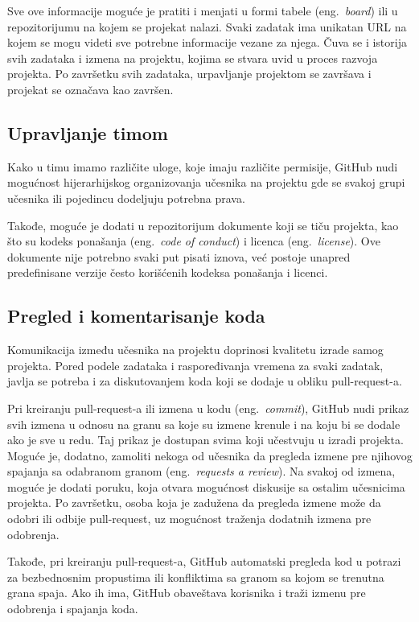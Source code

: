 \documentclass[12pt]{report}
\begin{document}
Sve ove informacije moguće je pratiti i menjati u formi tabele (eng.\ \textit{board}) ili u repozitorijumu na kojem se projekat nalazi. Svaki zadatak ima unikatan URL na kojem se mogu videti sve potrebne informacije vezane za njega. Čuva se i istorija svih zadataka i izmena na projektu, kojima se stvara uvid u proces razvoja projekta. Po završetku svih zadataka, urpavljanje projektom se završava i projekat se označava kao završen.

\subsection{Upravljanje timom}
Kako u timu imamo različite uloge, koje imaju različite permisije, GitHub nudi mogućnost hijerarhijskog organizovanja učesnika na projektu gde se svakoj grupi učesnika ili pojedincu dodeljuju potrebna prava.

Takođe, moguće je dodati u repozitorijum dokumente koji se tiču projekta, kao što su kodeks ponašanja (eng.\ \textit{code of conduct}) i licenca (eng.\ \textit{license}). Ove dokumente nije potrebno svaki put pisati iznova, već postoje unapred predefinisane verzije često korišćenih kodeksa ponašanja i licenci.

\subsection{Pregled i komentarisanje koda}
Komunikacija između učesnika na projektu doprinosi kvalitetu izrade samog projekta. Pored podele zadataka i raspoređivanja vremena za svaki zadatak, javlja se potreba i za diskutovanjem koda koji se dodaje u obliku pull-request-a.

Pri kreiranju pull-request-a ili izmena u kodu (eng.\ \textit{commit}), GitHub nudi prikaz svih izmena u odnosu na granu sa koje su izmene krenule i na koju bi se dodale ako je sve u redu. Taj prikaz je dostupan svima koji učestvuju u izradi projekta. Moguće je, dodatno, zamoliti nekoga od učesnika da pregleda izmene pre njihovog spajanja sa odabranom granom (eng.\ \textit{requests a review}). Na svakoj od izmena, moguće je dodati poruku, koja otvara mogućnost diskusije sa ostalim učesnicima projekta. Po završetku, osoba koja je zadužena da pregleda izmene može da odobri ili odbije pull-request, uz mogućnost traženja dodatnih izmena pre odobrenja.

Takođe, pri kreiranju pull-request-a, GitHub automatski pregleda kod u potrazi za bezbednosnim propustima ili konfliktima sa granom sa kojom se trenutna grana spaja. Ako ih ima, GitHub obaveštava korisnika i traži izmenu pre odobrenja i spajanja koda.
\end{document}
